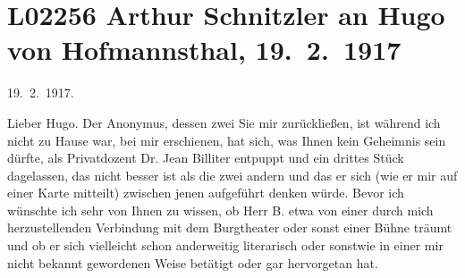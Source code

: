 

\section[Arthur Schnitzler an Hugo von Hofmannsthal, 19. 2. 1917]{L02256 Arthur Schnitzler an Hugo von Hofmannsthal, 19. 2. 1917}
\nopagebreak{}
\rehead{ }\normalsize\beginnumbering{}
\toendnotes[C]{\smallbreak\pagebreak[2]}\toendnotes[C]{\smallbreak}
\pstart
           {\pb}\label{K_L02256-1v}\label{K_L02256-1}\hfill 19. 2. 1917.\pend
           
\pstart{}Lieber Hugo.\pend\vspace{0.5em}
\pstart
           Der Anonymus, dessen zwei
                  \label{K_L02256-2v}\label{K_L02256-2}{ }Sie mir zurückließen, ist \label{K_L02256-3v}\label{K_L02256-3} während ich nicht zu Hause war, bei mir erschienen, hat sich, was Ihnen kein
               Geheimnis sein dürfte, als Privatdozent Dr. Jean
                  Billiter entpuppt und ein drittes Stück dagelassen, das nicht besser ist als
               die zwei andern und das er sich (wie er mir auf einer Karte mitteilt) zwischen jenen
               aufgeführt denken würde. Bevor ich \label{K_L02256-4v}\label{K_L02256-4} wünschte ich sehr von Ihnen zu wissen, ob Herr B. etwa von einer durch mich herzustellenden Verbindung mit dem
                  Burgtheater oder sonst einer Bühne träumt und
               ob er sich vielleicht schon anderweitig literarisch oder sonstwie in einer mir nicht
               bekannt gewordenen Weise betätigt oder gar hervorgetan hat.\pend
           
